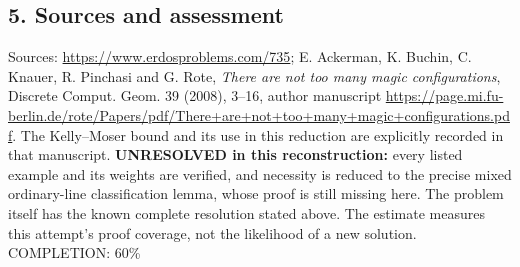 \subsection*{5. Sources and assessment}
Sources: \url{https://www.erdosproblems.com/735}; E. Ackerman, K. Buchin, C. Knauer, R. Pinchasi and G. Rote, \emph{There are not too many magic configurations}, Discrete Comput. Geom. 39 (2008), 3--16, author manuscript \url{https://page.mi.fu-berlin.de/rote/Papers/pdf/There+are+not+too+many+magic+configurations.pdf}. The Kelly--Moser bound and its use in this reduction are explicitly recorded in that manuscript.
\textbf{UNRESOLVED in this reconstruction:} every listed example and its weights are verified, and necessity is reduced to the precise mixed ordinary-line classification lemma, whose proof is still missing here. The problem itself has the known complete resolution stated above. The estimate measures this attempt's proof coverage, not the likelihood of a new solution.
\noindent COMPLETION: 60\%

